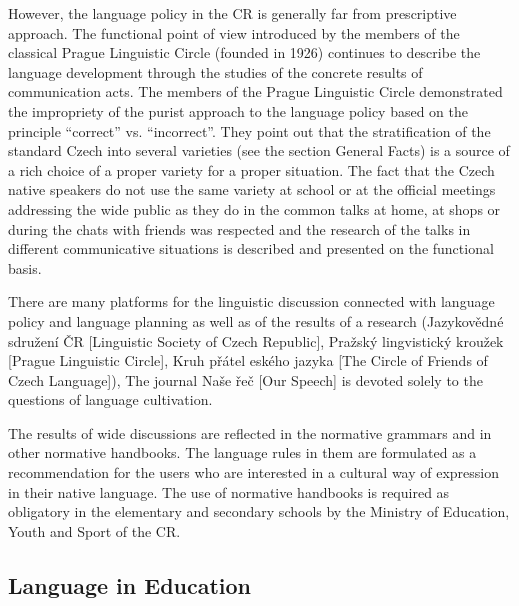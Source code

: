 \begin{multicols}{2}
However, the language policy in the CR is generally far from prescriptive approach. The functional point of view introduced by the members of the classical Prague Linguistic Circle (founded in 1926) continues to describe the language development through the studies of the concrete results of communication acts. The members of the Prague Linguistic Circle demonstrated the impropriety of the purist approach to the language policy based on the principle “correct” vs. “incorrect”.  They point out that the stratification of the standard Czech into several varieties (see the section General Facts) is a source of a rich choice of a proper variety for a proper situation. The fact that the Czech native speakers do not use the same variety at school or at the official meetings addressing the wide public as they do in the common talks at home, at shops or during the chats with friends was respected and the research of the talks in different communicative  situations is described and presented on the functional basis.

There are many platforms for the linguistic discussion connected with language policy and language planning as well as of the results of a research (Jazykovědné sdružení ČR [Linguistic Society of Czech Republic], Pražský lingvistický kroužek {[}Prague Linguistic Circle{]}, Kruh přátel
eského jazyka {[}The Circle of Friends of Czech Language{]}), The journal Naše řeč [Our Speech] is devoted solely to the questions of language cultivation.

The results of wide discussions are reflected in the normative grammars and in other normative handbooks. The language rules in them are formulated as a recommendation for the users who are interested in a cultural way of expression in their native language. The use of normative handbooks is required as obligatory in the elementary and secondary schools by the Ministry of Education, Youth and Sport of the CR.


\subsection{Language in Education}


\end{multicols}
